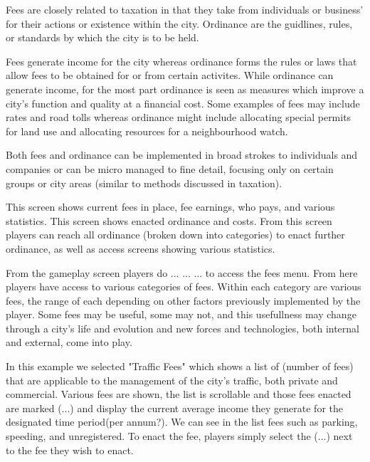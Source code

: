 Fees are closely related to taxation in that they take from individuals or business' for their actions or existence within the city. Ordinance are the guidlines, rules, or standards by which the city is to be held.

Fees generate income for the city whereas ordinance forms the rules or laws that allow fees to be obtained for or from certain activites. While ordinance can generate income, for the most part ordinance is seen as measures which improve a city's function and quality at a financial cost. Some examples of fees may include rates and road tolls whereas ordinance might include allocating special permits for land use and allocating resources for a neighbourhood watch.

Both fees and ordinance can be implemented in broad strokes to individuals and companies or can be micro managed to fine detail, focusing only on certain groups or city areas (similar to methods discussed in taxation).


This screen shows current fees in place, fee earnings, who pays, and various statistics.
This screen shows enacted ordinance and costs. From this screen players can reach all ordinance (broken down into categories) to enact further ordinance, as well as access screens showing various statistics. 


From the gameplay screen players do ... ... ... to access the fees menu. From here players have access to various categories of fees. Within each category are various fees, the range of each depending on other factors previously implemented by the player. Some fees may be useful, some may not, and this usefullness may change through a city's life and evolution and new forces and technologies, both internal and external, come into play.


In this example we selected "Traffic Fees" which shows a list of (number of fees) that are applicable to the management of the city's traffic, both private and commercial. Various fees are shown, the list is scrollable and those fees enacted are marked (...) and display the current average income they generate for the designated time period(per annum?).  We can see in the list fees such as parking, speeding, and unregistered. To enact the fee, players simply select the (...) next to the fee they wish to enact.  

